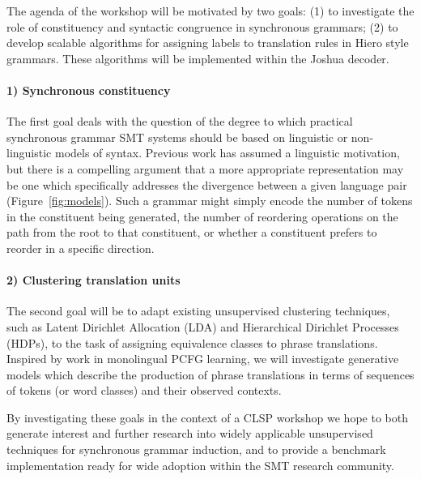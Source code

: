 \documentclass[10pt]{article}
\begin{document}
The agenda of the workshop will be motivated by two goals: (1) to investigate the role of constituency and syntactic congruence in synchronous grammars; (2) to develop scalable algorithms for assigning labels to translation rules in Hiero style grammars. These algorithms will be implemented within the Joshua decoder.

\paragraph{1) Synchronous constituency} 
The first goal deals with the question of the degree to which practical synchronous grammar SMT systems should be based on linguistic or non-linguistic models of syntax.
Previous work has assumed a linguistic motivation, but there is a compelling argument that a more appropriate representation may be one which specifically addresses the divergence between a given language pair (Figure~\ref{fig:models}).
Such a grammar might simply encode the number of tokens in the constituent being generated, the number of reordering operations on the path from the root to that constituent, or whether a constituent prefers to reorder in a specific direction.

\paragraph{2) Clustering translation units} 
The second goal will be to adapt existing unsupervised clustering techniques, such as Latent Dirichlet Allocation (LDA) and Hierarchical Dirichlet Processes (HDPs), to the task of assigning equivalence classes to phrase translations.
Inspired by work in monolingual PCFG learning, we will investigate generative models which describe the production of phrase translations in terms of sequences of tokens (or word classes) and their observed contexts.

By investigating these goals in the context of a CLSP workshop we hope to both generate interest and further research into widely applicable unsupervised techniques for synchronous grammar induction, and to provide a benchmark implementation ready for wide adoption within the SMT research community.
\end{document}
